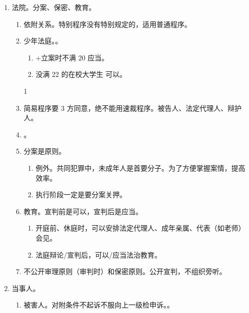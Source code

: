 \begin{enumerate}
\begin{enumerate}
\begin{enumerate}
\begin{enumerate}
                          \item {}。
                          \item {}。
                        \end{enumerate}
                \end{enumerate}
        \end{enumerate}
  \item 法院。分案、保密、教育。
        \begin{enumerate}
          \item 依附关系。特别程序没有特别规定的，适用普通程序。
          \item 少年法庭。。
                \begin{enumerate}
                  \item +立案时不满 20  \yjt 应当。
                  \item 没满 22 的在校大学生 \yjt 可以。
                \end{enumerate}1
          \item 简易程序要 3 方同意，绝不能用速裁程序。被告人、法定代理人、辩护人。
          \item {}。
          \item 分案是原则。
                \begin{enumerate}
                  \item 例外。共同犯罪中，未成年人是首要分子。为了方便掌握案情，提高效率。
                  \item 执行阶段一定是要分案关押。
                \end{enumerate}
          \item 教育。宣判前是可以，宣判后是应当。
                \begin{enumerate}
                  \item 开庭前、休庭时，可以安排法定代理人、成年亲属、代表（如老师）会见。
                  \item 法庭辩论/宣判后，可以/应当法治教育。
                \end{enumerate}
          \item 不公开审理原则（审判时）和保密原则。公开宣判，不组织旁听。
        \end{enumerate}
  \item 当事人。
        \begin{enumerate}
          \item 被害人。对附条件不起诉不服向上一级检申诉。。

\end{enumerate}
\end{enumerate}
